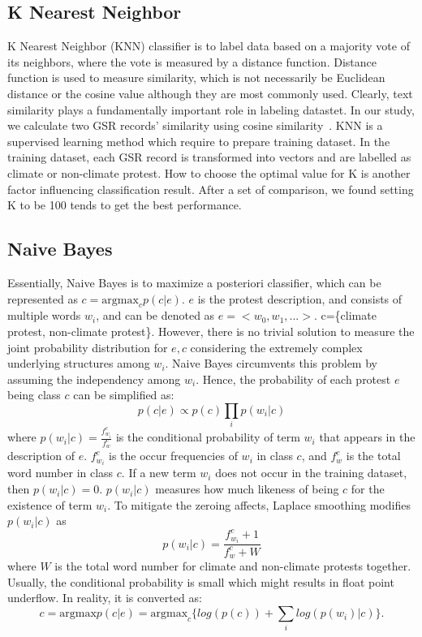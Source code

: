 \subsection{K Nearest Neighbor}
K Nearest Neighbor (KNN) classifier is to label data based on a majority vote of its neighbors, where the vote is measured by a distance function. Distance function is used to measure similarity, which is not necessarily be Euclidean distance or the cosine value although they are most commonly used. Clearly, text similarity plays a fundamentally important role in labeling datastet. In our study, we calculate two GSR records' similarity using cosine similarity~\cite{manning2008introduction}. KNN is a supervised learning method which require to prepare training dataset. In the training dataset, each GSR record is transformed into vectors and are labelled as climate or non-climate protest. How to choose the optimal value for K is another factor influencing classification result. After a set of comparison, we found setting K to be 100 tends to get the best performance.


\subsection{Naive Bayes}
Essentially, Naive Bayes is to maximize a posteriori classifier, which can be represented as $c = \mathrm{argmax}_c{p(c|e)}$. $e$ is the protest description, and consists of multiple words $w_i$, and can be denoted as $e=<w_0, w_1,...>$. c=\{climate protest, non-climate protest\}. However, there is no trivial solution to measure the joint probability distribution for $e,c$ considering the extremely complex underlying structures among $w_i$. Naive Bayes circumvents this problem by assuming the independency among $w_i$. Hence, the probability of each protest $e$ being class $c$ can be simplified as: $$p(c|e)\propto p(c)\prod_i p(w_i|c)$$ where $p(w_i|c)=\frac{f_{w_i}^c}{f_{w}^c}$ is the conditional probability of term $w_i$ that appears in the description of $e$. $f_{w_i}^c$ is the occur frequencies of $w_i$ in class $c$, and $f_{w}^c$ is the total word number in class $c$.  If a new term $w_i$ does not occur in the training dataset, then $p(w_i|c) = 0$. $p(w_i|c)$ measures how much likeness of being $c$ for the existence of term $w_i$. To mitigate the zeroing affects, Laplace smoothing modifies $p(w_i|c)$ as $$p(w_i|c)=\frac{f_{w_i}^c+1}{f_{w}^c+W}$$ where $W$ is the total word number for climate and non-climate protests together. Usually, the conditional probability is small which might results in float point underflow. In reality, it is converted as: $$c = \mathrm{argmax}{p(c|e)}=\mathrm{argmax}_c\{log(p(c)) + \sum_ilog(p(w_i)|c)\}.$$



